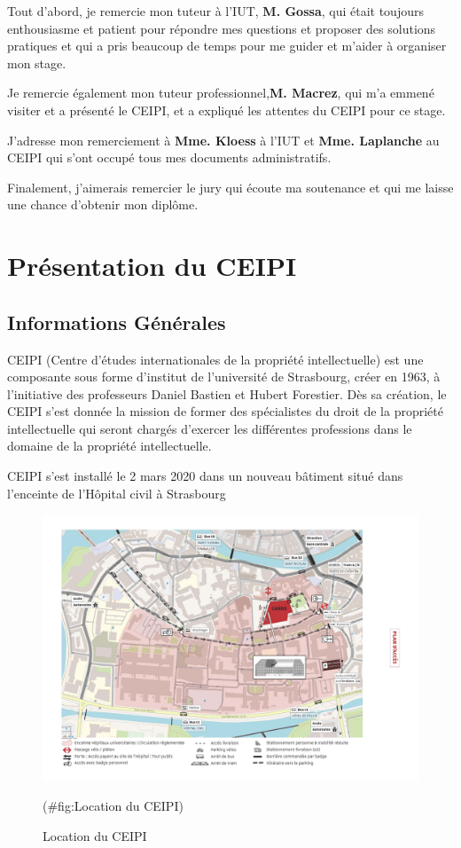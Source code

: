 \documentclass[
  oneside]{book}
\begin{document}
Tout d'abord, je remercie mon tuteur à l'IUT, \textbf{M. Gossa}, qui était toujours enthousiasme et patient pour répondre mes questions et proposer des solutions pratiques et qui a pris beaucoup de temps pour me guider et m'aider à organiser mon stage.

Je remercie également mon tuteur professionnel,\textbf{M. Macrez}, qui m'a emmené visiter et a présenté le CEIPI, et a expliqué les attentes du CEIPI pour ce stage.

J'adresse mon remerciement à \textbf{Mme. Kloess} à l'IUT et \textbf{Mme. Laplanche} au CEIPI qui s'ont occupé tous mes documents administratifs.

Finalement, j'aimerais remercier le jury qui écoute ma soutenance et qui me laisse une chance d'obtenir mon diplôme.

\hypertarget{pruxe9sentation-du-ceipi}{%
\chapter{Présentation du CEIPI}\label{pruxe9sentation-du-ceipi}}

\hypertarget{informations-guxe9nuxe9rales}{%
\section{Informations Générales}\label{informations-guxe9nuxe9rales}}

CEIPI (Centre d'études internationales de la propriété intellectuelle) est une composante sous forme d'institut de l'université de Strasbourg, créer en 1963, à l'initiative des professeurs Daniel Bastien et Hubert Forestier. Dès sa création, le CEIPI s'est donnée la mission de former des spécialistes du droit de la propriété intellectuelle qui seront chargés d'exercer les différentes professions dans le domaine de la propriété intellectuelle.

CEIPI s'est installé le 2 mars 2020 dans un nouveau bâtiment situé dans l'enceinte de l'Hôpital civil à Strasbourg

\begin{figure}

{\centering \includegraphics[width=0.8\linewidth]{images/Location_du_CEIPI} 

}

\caption{Location du CEIPI}(\#fig:Location du CEIPI)
\end{figure}
\end{document}

